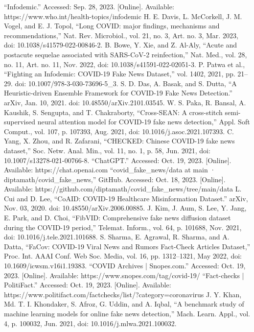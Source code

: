 \begin{CJK*}{UTF8}{bkai}
{
\begin{thebibliography}{00}
“Infodemic.” Accessed: Sep. 28, 2023. [Online]. Available: https://www.who.int/health-topics/infodemic
H. E. Davis, L. McCorkell, J. M. Vogel, and E. J. Topol, “Long COVID: major findings, mechanisms and recommendations,” Nat. Rev. Microbiol., vol. 21, no. 3, Art. no. 3, Mar. 2023, doi: 10.1038/s41579-022-00846-2.
B. Bowe, Y. Xie, and Z. Al-Aly, “Acute and postacute sequelae associated with SARS-CoV-2 reinfection,” Nat. Med., vol. 28, no. 11, Art. no. 11, Nov. 2022, doi: 10.1038/s41591-022-02051-3.
P. Patwa et al., “Fighting an Infodemic: COVID-19 Fake News Dataset,” vol. 1402, 2021, pp. 21–29. doi: 10.1007/978-3-030-73696-5\_3.
S. D. Das, A. Basak, and S. Dutta, “A Heuristic-driven Ensemble Framework for COVID-19 Fake News Detection.” arXiv, Jan. 10, 2021. doi: 10.48550/arXiv.2101.03545.
W. S. Paka, R. Bansal, A. Kaushik, S. Sengupta, and T. Chakraborty, “Cross-SEAN: A cross-stitch semi-supervised neural attention model for COVID-19 fake news detection,” Appl. Soft Comput., vol. 107, p. 107393, Aug. 2021, doi: 10.1016/j.asoc.2021.107393.
C. Yang, X. Zhou, and R. Zafarani, “CHECKED: Chinese COVID-19 fake news dataset,” Soc. Netw. Anal. Min., vol. 11, no. 1, p. 58, Jun. 2021, doi: 10.1007/s13278-021-00766-8.
“ChatGPT.” Accessed: Oct. 19, 2023. [Online]. Available: https://chat.openai.com
“covid\_fake\_news/data at main · diptamath/covid\_fake\_news,” GitHub. Accessed: Oct. 18, 2023. [Online]. Available: https://github.com/diptamath/covid\_fake\_news/tree/main/data
L. Cui and D. Lee, “CoAID: COVID-19 Healthcare Misinformation Dataset.” arXiv, Nov. 03, 2020. doi: 10.48550/arXiv.2006.00885.
J. Kim, J. Aum, S. Lee, Y. Jang, E. Park, and D. Choi, “FibVID: Comprehensive fake news diffusion dataset during the COVID-19 period,” Telemat. Inform., vol. 64, p. 101688, Nov. 2021, doi: 10.1016/j.tele.2021.101688.
S. Sharma, E. Agrawal, R. Sharma, and A. Datta, “FaCov: COVID-19 Viral News and Rumors Fact-Check Articles Dataset,” Proc. Int. AAAI Conf. Web Soc. Media, vol. 16, pp. 1312–1321, May 2022, doi: 10.1609/icwsm.v16i1.19383.
“COVID Archives | Snopes.com.” Accessed: Oct. 19, 2023. [Online]. Available: https://www.snopes.com/tag/covid-19/
“Fact-checks | PolitiFact.” Accessed: Oct. 19, 2023. [Online]. Available: https://www.politifact.com/factchecks/list/?category=coronavirus
J. Y. Khan, Md. T. I. Khondaker, S. Afroz, G. Uddin, and A. Iqbal, “A benchmark study of machine learning models for online fake news detection,” Mach. Learn. Appl., vol. 4, p. 100032, Jun. 2021, doi: 10.1016/j.mlwa.2021.100032.


\end{thebibliography}}
\end{CJK*}

